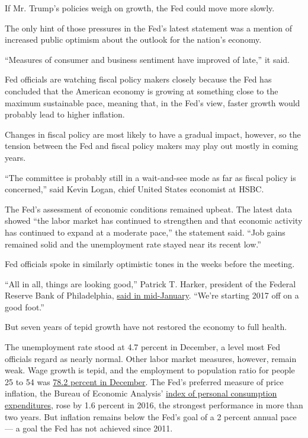 If Mr. Trump's policies weigh on growth, the Fed could move more slowly.

The only hint of those pressures in the Fed's latest statement was a
mention of increased public optimism about the outlook for the nation's
economy.

``Measures of consumer and business sentiment have improved of late,''
it said.

Fed officials are watching fiscal policy makers closely because the Fed
has concluded that the American economy is growing at something close to
the maximum sustainable pace, meaning that, in the Fed's view, faster
growth would probably lead to higher inflation.

Changes in fiscal policy are most likely to have a gradual impact,
however, so the tension between the Fed and fiscal policy makers may
play out mostly in coming years.

``The committee is probably still in a wait-and-see mode as far as
fiscal policy is concerned,'' said Kevin Logan, chief United States
economist at HSBC.

The Fed's assessment of economic conditions remained upbeat. The latest
data showed ``the labor market has continued to strengthen and that
economic activity has continued to expand at a moderate pace,'' the
statement said. ``Job gains remained solid and the unemployment rate
stayed near its recent low.''

Fed officials spoke in similarly optimistic tones in the weeks before
the meeting.

``All in all, things are looking good,'' Patrick T. Harker, president of
the Federal Reserve Bank of Philadelphia,
\href{https://www.philadelphiafed.org/publications/speeches/harker/2017/01-20-17-nj-bankers-association}{said
in mid-January}. ``We're starting 2017 off on a good foot.''

But seven years of tepid growth have not restored the economy to full
health.

The unemployment rate stood at 4.7 percent in December, a level most Fed
officials regard as nearly normal. Other labor market measures, however,
remain weak. Wage growth is tepid, and the employment to population
ratio for people 25 to 54 was
\href{https://data.bls.gov/timeseries/LNS12300060}{78.2 percent in
December}. The Fed's preferred measure of price inflation, the Bureau of
Economic Analysis'
\href{https://www.bea.gov/newsreleases/national/pi/pinewsrelease.htm}{index
of personal consumption expenditures}, rose by 1.6 percent in 2016, the
strongest performance in more than two years. But inflation remains
below the Fed's goal of a 2 percent annual pace --- a goal the Fed has
not achieved since 2011.

